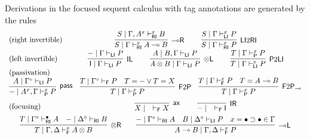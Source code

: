 \documentclass[copyright,creativecommons]{eptcs}
\theoremstyle{definition}
\newtheorem{defn}{Definition}[section]
\newcommand{\tl}{\otimes \mathsf{L}}
\newcommand{\tr}{\otimes \mathsf{R}}
\newcommand{\lright}{{\multimap}\mathsf{R}}
\newcommand{\lleft}{{\multimap}\mathsf{L}}
\newcommand{\pass}{\mathsf{pass}}
\newcommand{\unitl}{\mathsf{IL}}
\newcommand{\unitr}{\mathsf{IR}}
\newcommand{\ax}{\mathsf{ax}}
\newcommand{\ot}{\otimes}
\newcommand{\lolli}{\multimap}
\newcommand{\I}{\mathsf{I}}
\newcommand{\RI}{\mathsf{RI}}
\newcommand{\LI}{\mathsf{LI}}
\newcommand{\Pass}{\mathsf{P}}
\newcommand{\F}{\mathsf{F}}
\newcommand{\xvdash}{\vdash^{x}}
\newcommand{\proofbox}[1]{\begin{tabular}{l} #1 \end{tabular}}
\newcommand{\SkNMILL}{$\mathtt{SkNMILL}$}
\newcommand{\FSkMCC}{\mathsf{Free}}
\begin{document}
Derivations in the focused sequent calculus with tag annotations are generated by the rules
\begin{equation}\label{eq:focus}
  \begin{array}{lc}
    \text{(right invertible)} & %
    \proofbox{
      \infer[\lright]{S \mid \Gamma \vdash^{x}_{\RI} A \lolli B}{S \mid \Gamma , A^{x} \vdash^{x}_{\RI} B}
    \qquad
    \infer[\LI 2 \RI]{S \mid \Gamma \vdash^{x}_{\RI} P}{S \mid \Gamma \vdash^{x}_{\LI} P}
    }
    \\[6pt]
    \text{(left invertible)} & %
    \proofbox{
      \infer[\unitl]{\I \mid \Gamma \vdash_{\LI} P}{{-} \mid \Gamma \vdash_{\LI} P}
    \qquad
    \infer[\tl]{A \ot B \mid \Gamma \vdash_{\LI} P}{A \mid B , \Gamma \vdash_{\LI} P}
    \qquad
    \infer[\Pass 2 \LI]{T \mid \Gamma \xvdash_{\LI} P}{T \mid \Gamma \xvdash_{\Pass} P}
    }
    \\
    \text{(passivation)} & \\ %
   \multicolumn{2}{c}{
    \infer[\pass]{{-} \mid A^{x} , \Gamma \xvdash_{\Pass} P }{
      A\mid \Gamma^{\circ} \vdash_{\LI} P
    }
    \quad
%
    \infer[\F 2 \Pass]{T \mid \Gamma \xvdash_{\Pass} P}{
      T \mid \Gamma^\circ \vdash_{\F} P &
      T = {-} \vee T = X
    }
    \quad
    \infer[\F 2 \Pass_{{\lolli}}]{T \mid \Gamma \xvdash_{\Pass} P}{
      T \mid \Gamma \xvdash_{\F} P &
      T = A \lolli B
    }
    }
    \\[6pt]
    \text{(focusing)} &    %
    \proofbox{\infer[\ax]{X \mid \quad \vdash_{\F} X}{}
    \qquad
    \infer[\unitr]{{-} \mid \quad \vdash_{\F} \I}{}
    }
    \\[6pt]
    \multicolumn{2}{c}{
    \infer[\tr]{T \mid \Gamma , \Delta \xvdash_{\F} A \ot B}{
      T \mid \Gamma^{\circ} \vdash^{\bullet}_{\RI} A
      &
      {-} \mid \Delta^{\circ} \vdash_{\RI} B
    }
    \qquad
    \infer[\lleft]{A \lolli B \mid \Gamma , \Delta \xvdash_{\F} P}{
      {-} \mid \Gamma^{\circ} \vdash_{\RI} A
      &
      B \mid \Delta^{\circ} \vdash_{\LI} P
      &
      x = \bullet \supset \bullet \in \Gamma
    }
    }
  \end{array}
\end{equation}
\end{document}
